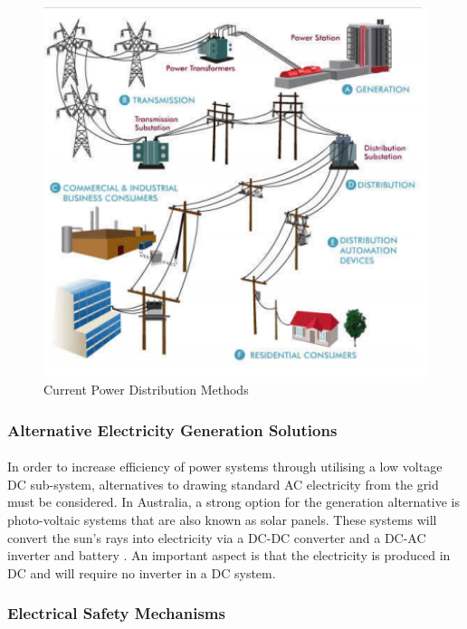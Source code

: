 \begin{figure}[H]
\hfill\includegraphics[width = 130mm]{images/Power_Distro}\hspace*{\fill}
\caption{Current Power Distribution Methods \cite{Active2015}}
\label{fig:CurrentPower}
\end{figure}    

\subsubsection{Alternative Electricity Generation Solutions}

\paragraph{}
In order to increase efficiency of power systems through utilising a low voltage DC sub-system, alternatives to drawing standard AC electricity from the grid must be considered. In Australia, a strong option for the generation alternative is photo-voltaic systems that are also known as solar panels. These systems will convert the sun’s rays into electricity via a DC-DC converter and a DC-AC inverter and battery \cite{Pillay2004}. An important aspect is that the electricity is produced in DC and will require no inverter in a DC system.

\subsubsection{Electrical Safety Mechanisms}

